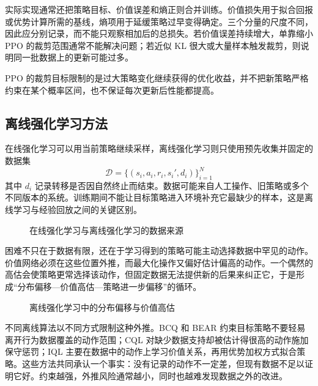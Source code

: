 \documentclass[UTF8,a4paper,zihao=-4,oneside,openany]{ctexbook}
\begin{document}
实际实现通常还把策略目标、价值误差和熵正则合并训练。价值损失用于拟合回报或优势计算所需的基线，熵项用于延缓策略过早变得确定。三个分量的尺度不同，因此应分别记录，而不能只观察相加后的总损失。若价值误差持续增大，单靠缩小 PPO 的裁剪范围通常不能解决问题；若近似 KL 很大或大量样本触发裁剪，则说明同一批数据上的更新可能过多。

\begin{importantnote}
  PPO 的裁剪目标限制的是过大策略变化继续获得的优化收益，并不把新策略严格约束在某个概率区间，也不保证每次更新后性能都提高。
\end{importantnote}

\subsection{离线强化学习方法}

在线强化学习可以用当前策略继续采样，离线强化学习则只使用预先收集并固定的数据集
\begin{equation}
\mathcal D=\{(s_i,a_i,r_i,s_i',d_i)\}_{i=1}^{N}
\end{equation}
其中 $d_i$ 记录转移是否因自然终止而结束。数据可能来自人工操作、旧策略或多个不同版本的系统。训练期间不能让目标策略进入环境补充它最缺少的样本，这是离线学习与经验回放之间的关键区别。

\begin{figure}[htbp]
  \centering
  \resizebox{0.92\linewidth}{!}{
    
  }
  \caption{在线强化学习与离线强化学习的数据来源}
  \label{fig:online_offline_rl}
\end{figure}

困难不只在于数据有限，还在于学习得到的策略可能主动选择数据中罕见的动作。价值网络必须在这些位置外推，而最大化操作又偏好估计偏高的动作。一个偶然的高估会使策略更常选择该动作，但固定数据无法提供新的后果来纠正它，于是形成“分布偏移—价值高估—策略进一步偏移”的循环。

\begin{figure}[htbp]
  \centering
  \resizebox{0.92\linewidth}{!}{
    
  }
  \caption{离线强化学习中的分布偏移与价值高估}
  \label{fig:offline_rl_distribution_shift}
\end{figure}

不同离线算法以不同方式限制这种外推。BCQ 和 BEAR 约束目标策略不要轻易离开行为数据覆盖的动作范围；CQL 对缺少数据支持却被估计得很高的动作施加保守惩罚；IQL 主要在数据中的动作上学习价值关系，再用优势加权方式拟合策略。这些方法共同承认一个事实：没有记录的动作不一定差，但现有数据不足以证明它好。约束越强，外推风险通常越小，同时也越难发现数据之外的改进。
\end{document}
